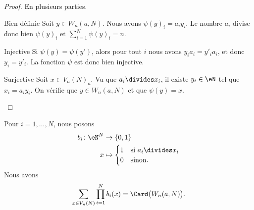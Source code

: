 \begin{proof}
	En plusieurs parties.
	\begin{subproof}
		\item[Bien définie]
		Soit \( y\in W_n(a,N)\). Nous avons \( \psi(y)_i=a_iy_i\). Le nombre \( a_i\) divise donc bien \( \psi(y)_i\) et \( \sum_{i=1}^N\psi(y)_i=n\).
		\item[Injective]
		Si \( \psi(y)=\psi(y')\), alors pour tout \( i\) nous avons \( y_ia_i=y'_ia_i\), et donc \( y_i=y'_i\). La fonction \( \psi\) est donc bien injective.
		\item[Surjective]
		Soit \( x\in V_n(N)_a\). Vu que \( a_i\divides x_i\), il existe \( y_i\in \eN\) tel que \( x_i=a_iy_i\). On vérifie que \( y\in W_n(a,N)\) et que \( \psi(y)=x\).
	\end{subproof}
\end{proof}


\begin{lemma}       \label{LEMooOPXHooHzoHrm}
	Pour \( i=1,\ldots, N\), nous posons
	\begin{equation}
		\begin{aligned}
			b_i\colon \eN^N & \to \{ 0,1 \}                      \\
			x               & \mapsto \begin{cases}
				1 & \text{si } a_i\divides x_i \\
				0 & \text{sinon. }
			\end{cases}
		\end{aligned}
	\end{equation}
	Nous avons
	\begin{equation}
		\sum_{x\in V_n(N)}\prod_{i=1}^Nb_i(x)=\Card\big( W_n(a,N) \big).
	\end{equation}
\end{lemma}

